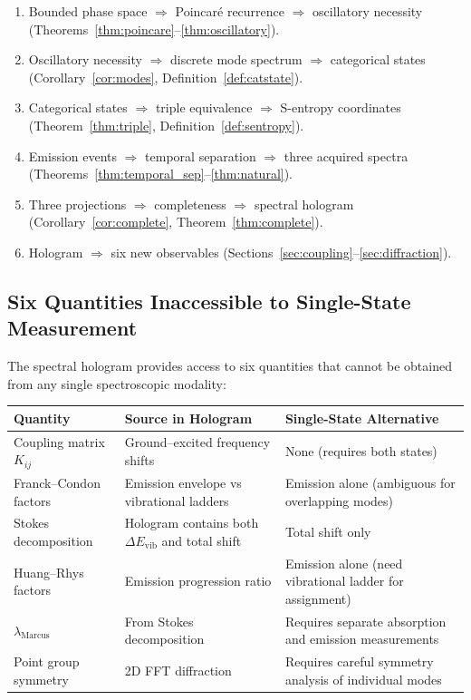 \documentclass[11pt,a4paper]{article}
\theoremstyle{definition}
\theoremstyle{remark}
\begin{document}
\begin{enumerate}
  \item Bounded phase space $\Rightarrow$ Poincar{\'e} recurrence $\Rightarrow$ oscillatory necessity (Theorems~\ref{thm:poincare}--\ref{thm:oscillatory}).
  \item Oscillatory necessity $\Rightarrow$ discrete mode spectrum $\Rightarrow$ categorical states (Corollary~\ref{cor:modes}, Definition~\ref{def:catstate}).
  \item Categorical states $\Rightarrow$ triple equivalence $\Rightarrow$ S-entropy coordinates (Theorem~\ref{thm:triple}, Definition~\ref{def:sentropy}).
  \item Emission events $\Rightarrow$ temporal separation $\Rightarrow$ three acquired spectra (Theorems~\ref{thm:temporal_sep}--\ref{thm:natural}).
  \item Three projections $\Rightarrow$ completeness $\Rightarrow$ spectral hologram (Corollary~\ref{cor:complete}, Theorem~\ref{thm:complete}).
  \item Hologram $\Rightarrow$ six new observables (Sections~\ref{sec:coupling}--\ref{sec:diffraction}).
\end{enumerate}

\subsection{Six Quantities Inaccessible to Single-State Measurement}

The spectral hologram provides access to six quantities that cannot be obtained from any single spectroscopic modality:

\begin{center}
\begin{tabular}{p{4cm}p{5cm}p{4cm}}
\toprule
Quantity & Source in Hologram & Single-State Alternative \\
\midrule
Coupling matrix $K_{ij}$ & Ground--excited frequency shifts & None (requires both states) \\
Franck--Condon factors & Emission envelope vs vibrational ladders & Emission alone (ambiguous for overlapping modes) \\
Stokes decomposition & Hologram contains both $\Delta E_{\mathrm{vib}}$ and total shift & Total shift only \\
Huang--Rhys factors & Emission progression ratio & Emission alone (need vibrational ladder for assignment) \\
$\lambda_{\mathrm{Marcus}}$ & From Stokes decomposition & Requires separate absorption and emission measurements \\
Point group symmetry & 2D FFT diffraction & Requires careful symmetry analysis of individual modes \\
\bottomrule
\end{tabular}
\end{center}
\end{document}
